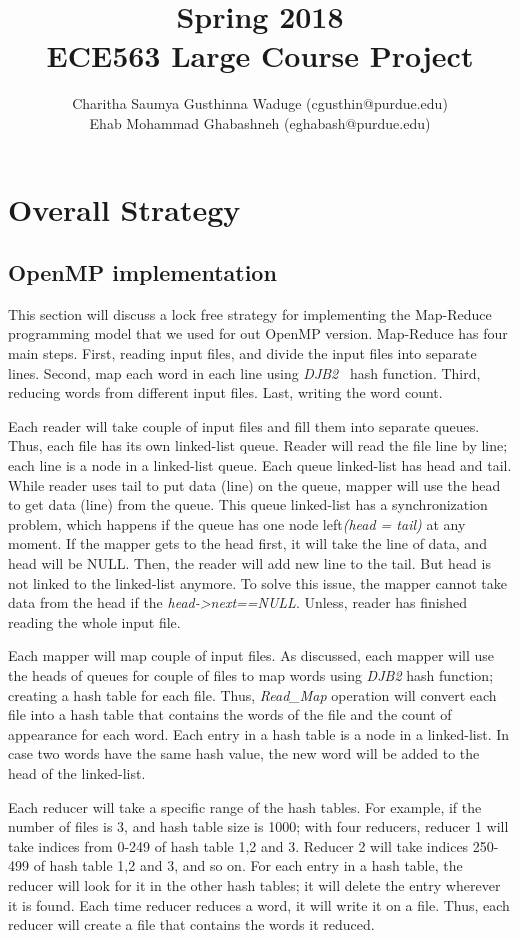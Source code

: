 \documentclass[12pt]{article}
\title{Spring 2018\\  ECE563 Large Course Project}
\author{Charitha Saumya Gusthinna Waduge (cgusthin@purdue.edu) \\ Ehab Mohammad Ghabashneh (eghabash@purdue.edu)}
\begin{document}
\maketitle
\section{Overall Strategy}
\subsection{OpenMP implementation}
This section will discuss a lock free strategy for implementing the Map-Reduce programming model that we used for out OpenMP version. Map-Reduce has four main steps. First, reading input files, and divide the input files into separate lines. Second, map each word in each line using {\em DJB2}~\cite{djb2} hash function. Third, reducing words from different input files. Last, writing the word count. 

Each reader will take couple of input files and fill them into separate queues. Thus, each file has its own linked-list queue. Reader will read the file line by line; each line is a node in a linked-list queue. Each queue linked-list has head and tail. While reader uses tail to put data (line) on the queue, mapper will use the head to get data (line) from the queue. This queue linked-list has a synchronization problem, which happens if the queue has one node left{\em (head = tail)} at any moment. If the mapper gets to the head first, it will take the line of data, and head will be NULL. Then, the reader will add new line to the tail. But head is not linked to the linked-list anymore. To solve this issue, the mapper cannot take data from the head if the {\em head->next==NULL}. Unless, reader has finished reading the whole input file. 

Each mapper will map couple of input files. As discussed, each mapper will use the heads of queues for couple of files to map words using {\em DJB2} hash function; creating a hash table for each file. Thus, {\em Read\_Map} operation will convert each file into a hash table that contains the words of the file and the count of appearance for each word. Each entry in a hash table is a node in a linked-list. In case two words have the same hash value, the new word will be added to the head of the linked-list.

Each reducer will take a specific range of the hash tables. For example, if the number of files is 3, and hash table size is 1000; with four reducers, reducer 1 will take indices from 0-249 of hash table 1,2 and 3. Reducer 2 will take indices 250-499 of hash table 1,2 and 3, and so on. For each entry in a hash table, the reducer will look for it in the other hash tables; it will delete the entry wherever it is found. Each time reducer reduces a word, it will write it on a file. Thus, each reducer will create a file that contains the words it reduced.
\label{omp-impl}
\end{document}
